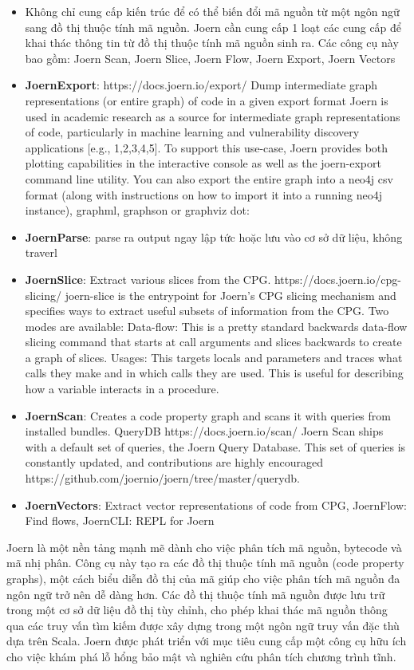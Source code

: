 \begin{itemize}
  \item Không chỉ cung cấp kiến trúc để có thể biến đổi mã nguồn từ một ngôn ngữ sang đồ thị thuộc tính mã nguồn. Joern cần cung cấp 1 loạt các cung cấp để khai thác thông tin từ đồ thị thuộc tính mã nguồn sinh ra. Các công cụ này bao gồm: Joern Scan, Joern Slice, Joern Flow, Joern Export, Joern Vectors
  \item \textbf{JoernExport}: https://docs.joern.io/export/
  Dump intermediate graph representations (or entire graph) of code in a given export format
  Joern is used in academic research as a source for intermediate graph representations of code, particularly in machine learning and vulnerability discovery applications [e.g., 1,2,3,4,5]. To support this use-case, Joern provides both plotting capabilities in the interactive console as well as the joern-export command line utility.
  You can also export the entire graph into a neo4j csv format (along with instructions on how to import it into a running neo4j instance), graphml, graphson or graphviz dot:
  \item \textbf{JoernParse}: parse ra output ngay lập tức hoặc lưu vào cơ sở dữ liệu, không traverl
  \item \textbf{JoernSlice}: Extract various slices from the CPG.
  https://docs.joern.io/cpg-slicing/
  joern-slice is the entrypoint for Joern’s CPG slicing mechanism and specifies ways to extract useful subsets of information from the CPG. Two modes are available:
  Data-flow: This is a pretty standard backwards data-flow slicing command that starts at call arguments and slices backwards to create a graph of slices.
  Usages: This targets locals and parameters and traces what calls they make and in which calls they are used. This is useful for describing how a variable interacts in a procedure.
  \item \textbf{JoernScan}: Creates a code property graph and scans it with queries from installed bundles. QueryDB
  https://docs.joern.io/scan/
  Joern Scan ships with a default set of queries, the Joern Query Database. This set of queries is constantly updated, and contributions are highly encouraged https://github.com/joernio/joern/tree/master/querydb.
  \item \textbf{JoernVectors}: Extract vector representations of code from CPG, JoernFlow: Find flows, JoernCLI: REPL for Joern
\end{itemize}

Joern là một nền tảng mạnh mẽ dành cho việc phân tích mã nguồn, bytecode và mã nhị phân.
Công cụ này tạo ra các đồ thị thuộc tính mã nguồn (code property graphs), một cách biểu diễn đồ thị của mã giúp cho việc phân tích mã nguồn đa ngôn ngữ trở nên dễ dàng hơn.
Các đồ thị thuộc tính mã nguồn được lưu trữ trong một cơ sở dữ liệu đồ thị tùy chỉnh, cho phép khai thác mã nguồn thông qua các truy vấn tìm kiếm được xây dựng trong một ngôn ngữ truy vấn đặc thù dựa trên Scala.
Joern được phát triển với mục tiêu cung cấp một công cụ hữu ích cho việc khám phá lỗ hổng bảo mật và nghiên cứu phân tích chương trình tĩnh.


